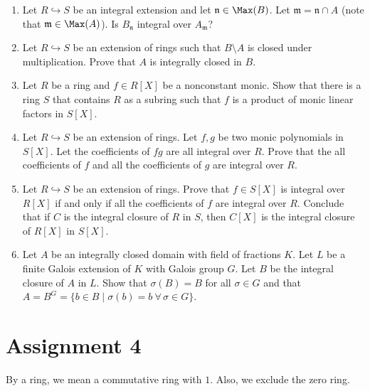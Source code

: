 \begin{enumerate}[label=\arabic*.]
\item Let $R \hookrightarrow S$ be an integral extension and let $\mathfrak n \in \Max(B)$. Let $\mathfrak m = \mathfrak n \cap A$ (note that $\mathfrak m \in \Max(A)$). Is $B_{\mathfrak n}$ integral over $A_{\mathfrak m}$?

\item Let $R \hookrightarrow S$ be an extension of rings such that $B \setminus A$ is closed under multiplication. Prove that $A$ is integrally closed in $B$.

\item Let $R$ be a ring and $f \in R[X]$ be a nonconstant monic. Show that there is a ring $S$ that contains $R$ as a subring such that $f$ is a product of monic linear factors in $S[X]$.

\item Let $R \hookrightarrow S$ be an extension of rings. Let $f,g$ be two monic polynomials in $S[X]$. Let the coefficients of $fg$ are all integral over $R$. Prove that the all coefficients of $f$ and all the coefficients of $g$ are integral over $R$.

\item Let $R \hookrightarrow S$ be an extension of rings. Prove that $f \in S[X]$ is integral over $R[X]$ if and only if all the coefficients of $f$ are integral over $R$. Conclude that if $C$ is the integral closure of $R$ in $S$, then $C[X]$ is the integral closure of $R[X]$ in $S[X]$.

\item Let $A$ be an integrally closed domain with field of fractions $K$. Let $L$ be a finite Galois extension of $K$ with Galois group $G$. Let $B$ be the integral closure of $A$ in $L$. Show that $\sigma(B) = B$ for all $\sigma \in G$ and that $A = B^G = \{ b \in B \mid \sigma(b) = b\ \forall\, \sigma \in G \}$.

\end{enumerate}

\section{Assignment 4}

\begin{convention}
By a ring, we mean a commutative ring with $1$. Also, we exclude the zero ring.
\end{convention}

